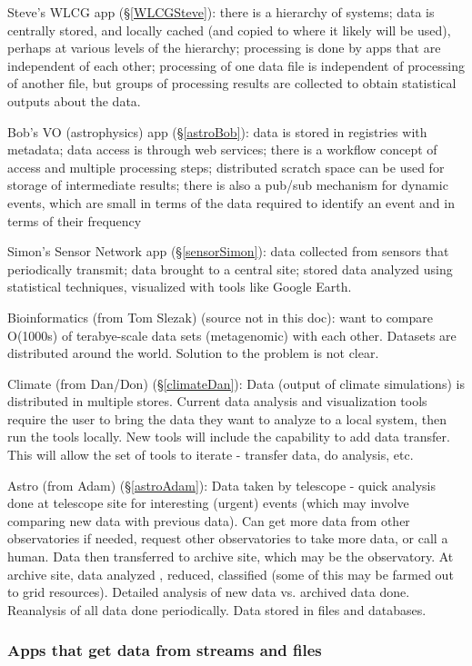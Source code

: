 \documentclass[preprint,12pt]{article}
\begin{document}
Steve's WLCG app (\S\ref{WLCGSteve}): there is a hierarchy of systems; data is centrally stored, and locally cached (and copied to where it likely will be used), perhaps at various levels of the hierarchy; processing is done by apps that are independent of each other; processing of one data file is independent of processing of another file, but groups of processing results are collected to obtain statistical outputs about the data.

Bob's VO (astrophysics) app (\S\ref{astroBob}): data is stored in registries with metadata; data access is through web services; there is a workflow concept of access and multiple processing steps; distributed scratch space can be used for storage of intermediate results; there is also a pub/sub mechanism for dynamic events, which are small in terms of the data required to identify an event and in terms of their frequency

Simon's Sensor Network app (\S\ref{sensorSimon}): data collected from sensors that periodically transmit; data brought to a central site; stored data analyzed using statistical techniques, visualized with tools like Google Earth.

Bioinformatics (from Tom Slezak) (source not in this doc): want to compare O(1000s) of terabye-scale data sets (metagenomic) with each other.  Datasets are distributed around the world.  Solution to the problem is not clear.

Climate (from Dan/Don) (\S\ref{climateDan}): Data (output of climate simulations) is distributed in multiple stores.  Current data analysis and visualization tools require the user to bring the data they want to analyze to a local system, then run the tools locally.  New tools will include the capability to add data transfer.  This will allow the set of tools to iterate - transfer data, do analysis, etc.

Astro (from Adam) (\S\ref{astroAdam}): Data taken by telescope - quick analysis done at telescope site for interesting (urgent) events (which may involve comparing new data with previous data).
Can get more data from other observatories if needed, request other observatories to take more data, or call a human. Data then transferred to archive site, which may be the observatory. At archive site, data analyzed , reduced, classified (some of this may be farmed out to grid resources).  Detailed analysis of new data vs. archived data done.  Reanalysis of all data done periodically.  Data stored in files and databases.


\subsubsection{Apps that get data from streams and files}
\end{document}
